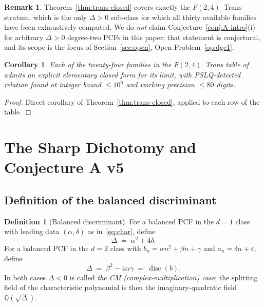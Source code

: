 \documentclass[11pt,reqno]{amsart}
\newtheorem{corollary}[theorem]{Corollary}
\theoremstyle{definition}
\newtheorem{definition}[theorem]{Definition}
\newtheorem{remark}[theorem]{Remark}
\DeclareMathOperator{\disc}{disc}
\begin{document}
\begin{remark}\label{rem:thm-scope}
Theorem~\ref{thm:trans-closed} covers exactly the
$F(2,4)$~Trans stratum, which is the only $\Delta>0$
sub-class for which all thirty available families have been
exhaustively computed. We do \emph{not} claim
Conjecture~\ref{conj:A-intro}(i) for arbitrary $\Delta>0$
degree-two PCFs in this paper; that statement is
conjectural, and its scope is the focus of
Section~\ref{sec:open}, Open Problem~\ref{op:dge1}.
\end{remark}

\begin{corollary}\label{cor:24-cf}
Each of the twenty-four families in the $F(2,4)$~Trans table
of~\cite[Appendix~B]{Papanokechi2026F24} admits an explicit
elementary closed form for its limit, with PSLQ-detected
relation found at integer bound $\le 10^{6}$ and working
precision $\le 80$ digits.
\end{corollary}

\begin{proof}
Direct corollary of Theorem~\ref{thm:trans-closed}, applied
to each row of the table.
\end{proof}

\section{The Sharp Dichotomy and Conjecture A v5}
\label{sec:dichotomy}

\subsection{Definition of the balanced discriminant}

\begin{definition}[Balanced discriminant]\label{def:Delta}
For a balanced PCF in the $d=1$ class with leading data
$(\alpha,\delta)$ as in~\eqref{eq:char}, define
\[
\Delta \;=\; \alpha^{2} + 4\delta.
\]
For a balanced PCF in the $d=2$ class with
$b_{n} = \alpha n^{2} + \beta n + \gamma$ and
$a_{n} = \delta n + \varepsilon$, define
\[
\Delta \;=\; \beta^{2} - 4\alpha\gamma \;=\; \disc(b).
\]
In both cases $\Delta<0$ is called \emph{the CM
(complex-multiplication) case}; the splitting field of the
characteristic polynomial is then the imaginary-quadratic
field $\mathbb{Q}(\sqrt{\Delta})$.
\end{definition}
\end{document}
